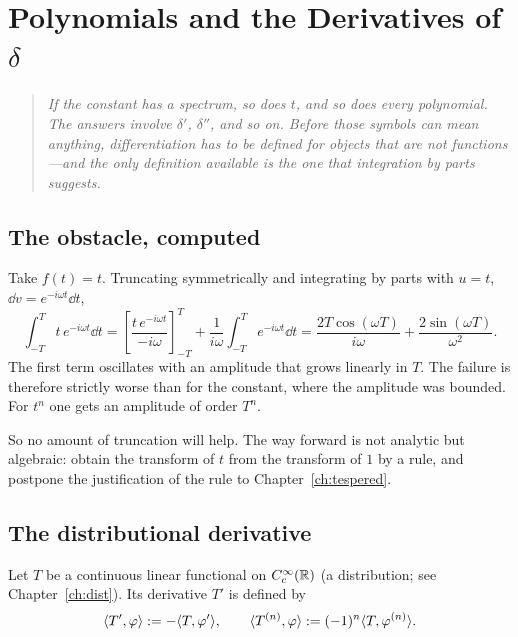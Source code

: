\chapter{Polynomials and the Derivatives of \texorpdfstring{$\delta$}{delta}}
\label{ch:polynomial}

\begin{quote}
\itshape
If the constant has a spectrum, so does $t$, and so does every polynomial. The answers involve
$\delta'$, $\delta''$, and so on. Before those symbols can mean anything, differentiation has to be
defined for objects that are not functions---and the only definition available is the one that
integration by parts suggests.
\end{quote}

\section{The obstacle, computed}

Take $f(t)=t$. Truncating symmetrically and integrating by parts with $u=t$,
$\dd v=e^{-i\omega t}\dd t$,
\begin{equation}
\int_{-T}^{T}t\,e^{-i\omega t}\dd t
=\left[\frac{t\,e^{-i\omega t}}{-i\omega}\right]_{-T}^{T}
+\frac{1}{i\omega}\int_{-T}^{T}e^{-i\omega t}\dd t
=\frac{2T\cos(\omega T)}{i\omega}+\frac{2\sin(\omega T)}{\omega^{2}} .
\label{eq:t-truncated}
\end{equation}
The first term oscillates with an amplitude that grows linearly in $T$. The failure is therefore
strictly worse than for the constant, where the amplitude was bounded. For $t^{n}$ one gets an
amplitude of order $T^{n}$.

So no amount of truncation will help. The way forward is not analytic but algebraic: obtain the
transform of $t$ from the transform of $1$ by a rule, and postpone the justification of the rule to
Chapter~\ref{ch:tespered}.

\section{The distributional derivative}

\begin{definition}\label{def:distderiv}
Let $T$ be a continuous linear functional on $C_{c}^{\infty}(\mathbb{R})$ (a distribution; see
Chapter~\ref{ch:dist}). Its derivative $T'$ is defined by
\begin{equation}
\langle T',\varphi\rangle:=-\langle T,\varphi'\rangle,
\qquad
\langle T^{(n)},\varphi\rangle:=(-1)^{n}\langle T,\varphi^{(n)}\rangle .
\label{eq:distderiv}
\end{equation}
\end{definition}

